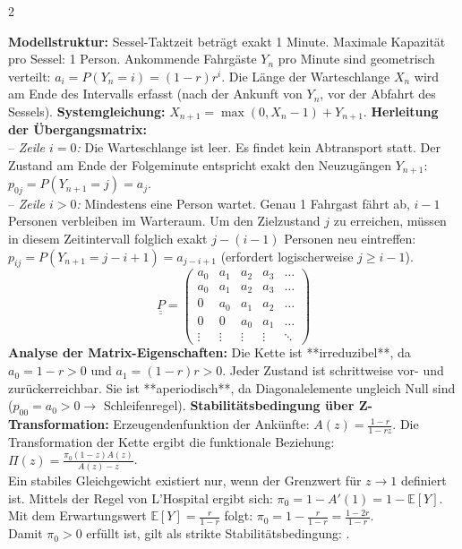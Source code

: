 \documentclass[a4paper, 9pt]{extarticle}
\begin{document}
\begin{multicols*}{2}
\begin{tcolorbox}[title={Der unendliche Sesselift (Aufgabe 5)}, colframe=markovviolet, colback=markovviolet!5, colbacktitle=markovviolet]
\textbf{Modellstruktur:} Sessel-Taktzeit beträgt exakt 1 Minute. Maximale Kapazität pro Sessel: 1 Person. Ankommende Fahrgäste $Y_n$ pro Minute sind geometrisch verteilt: $a_i = P(Y_n = i) = (1-r)r^i$. Die Länge der Warteschlange $X_n$ wird am Ende des Intervalls erfasst (nach der Ankunft von $Y_n$, vor der Abfahrt des Sessels).
\smallskip
\textbf{Systemgleichung:} $X_{n+1} = \max(0, X_n - 1) + Y_{n+1}$.
\smallskip
\textbf{Herleitung der Übergangsmatrix:}
\\-- \textit{Zeile $i = 0$:} Die Warteschlange ist leer. Es findet kein Abtransport statt. Der Zustand am Ende der Folgeminute entspricht exakt den Neuzugängen $Y_{n+1}$:
\\$p_{0j} = P(Y_{n+1} = j) = a_j$.
\\-- \textit{Zeile $i > 0$:} Mindestens eine Person wartet. Genau 1 Fahrgast fährt ab, $i-1$ Personen verbleiben im Warteraum. Um den Zielzustand $j$ zu erreichen, müssen in diesem Zeitintervall folglich exakt $j - (i-1)$ Personen neu eintreffen:
\\$p_{ij} = P(Y_{n+1} = j - i + 1) = a_{j-i+1}$ (erfordert logischerweise $j \ge i-1$).
\smallskip
$$\underline{\underline{P}} = \begin{pmatrix} a_0 & a_1 & a_2 & a_3 & \dots \\ a_0 & a_1 & a_2 & a_3 & \dots \\ 0 & a_0 & a_1 & a_2 & \dots \\ 0 & 0 & a_0 & a_1 & \dots \\ \vdots & \vdots & \vdots & \vdots & \ddots \end{pmatrix}$$
\textbf{Analyse der Matrix-Eigenschaften:}
Die Kette ist **irreduzibel**, da $a_0 = 1-r > 0$ und $a_1 = (1-r)r > 0$. Jeder Zustand ist schrittweise vor- und zurückerreichbar. Sie ist **aperiodisch**, da Diagonalelemente ungleich Null sind ($p_{00} = a_0 > 0 \rightarrow$ Schleifenregel).
\smallskip
\textbf{Stabilitätsbedingung über Z-Transformation:}
Erzeugendenfunktion der Ankünfte: $A(z) = \frac{1-r}{1-rz}$. Die Transformation der Kette ergibt die funktionale Beziehung: $\Pi(z) = \frac{\pi_0 (1-z) A(z)}{A(z) - z}$.
\\Ein stabiles Gleichgewicht existiert nur, wenn der Grenzwert für $z \to 1$ definiert ist. Mittels der Regel von L'Hospital ergibt sich: $\pi_0 = 1 - A'(1) = 1 - \mathbb{E}[Y]$.
\\Mit dem Erwartungswert $\mathbb{E}[Y] = \frac{r}{1-r}$ folgt: $\pi_0 = 1 - \frac{r}{1-r} = \frac{1-2r}{1-r}$.
\\Damit $\pi_0 > 0$ erfüllt ist, gilt als strikte Stabilitätsbedingung: .
\end{tcolorbox}


\end{multicols*}
\end{document}
